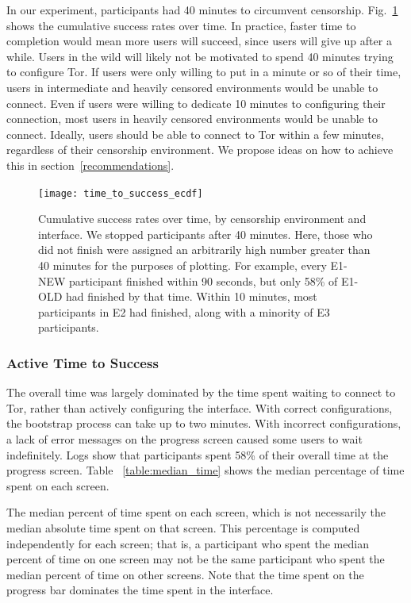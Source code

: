 \documentclass[USenglish,oneside,twocolumn]{article}
\begin{document}
{In our experiment, participants had 40 minutes to circumvent censorship. Fig.~\ref{fig:time_to_success_ecdf} shows the cumulative success rates over time. In practice, faster time to completion would mean more users will succeed, since users will give up after a while. Users in the wild will likely not be motivated to spend 40 minutes trying to configure Tor. If users were only willing to put in a minute or so of their time, users in intermediate and heavily censored environments would be unable to connect. Even if users were willing to dedicate 10 minutes to configuring their connection, most users in heavily censored environments would be unable to connect. Ideally, users should be able to connect to Tor within a few minutes, regardless of their censorship environment. We propose ideas on how to achieve this in section~\ref{recommendations}. 

\begin{figure}[t]
\centering
\texttt{[image: time\_to\_success\_ecdf]}

\caption{
Cumulative success rates over time, by censorship environment and interface.
We stopped participants after 40 minutes. Here, those who did not finish were assigned
an arbitrarily high number greater than 40 minutes for the purposes of plotting. 
For example, every E1-NEW participant finished within 90 seconds,
but only 58\% of E1-OLD had finished by that time. Within 10 minutes, most
participants in E2 had finished, along with a minority of E3 participants. 
}
\label{fig:time_to_success_ecdf}
\end{figure}

\subsubsection{Active Time to Success} 
The overall time was largely dominated by the time spent waiting to connect to Tor, rather than actively configuring the interface. With correct configurations, the bootstrap process can take up to two minutes.  With incorrect configurations, a lack of error messages on the progress screen caused some users to wait indefinitely.  Logs show that participants spent 58\% of their overall time at the progress screen. Table ~\ref{table:median_time} shows the median percentage of time spent on each screen. 

\begin{table}[t]
\centering

\caption{The median percent of time spent on each screen, which is not
necessarily the median absolute time spent on that screen. 
This percentage is computed independently for each screen; that is, a participant who spent the median percent 
of time on one screen may not be the same participant who spent the median percent
of time on other screens. Note that the time spent on the progress bar dominates the 
time spent in the interface.} 
\label{table:median_time}
\end{table}

}
\end{document}
